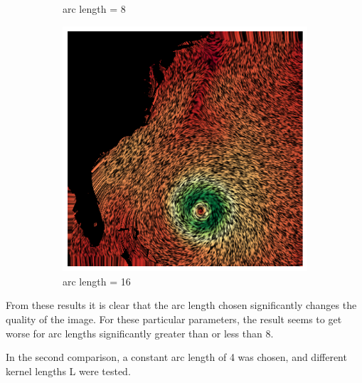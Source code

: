 \documentclass{article}
\begin{document}
\begin{figure}[h!]
\begin{subfigure}{0.32\textwidth}
        \caption{arc length = 8}
    \end{subfigure}
    \hfill
    \begin{subfigure}{0.32\textwidth}
        \centering
        \includegraphics[width=\textwidth]{steps_8000_kernel_length_16.png}
        \caption{arc length = 16}
    \end{subfigure}
    \caption{}
\end{figure}

From these results it is clear that the arc length chosen significantly
changes the quality of the image. For these particular parameters, the result seems to get worse for arc lengths significantly
greater than or less than 8. 

In the second comparison, a constant arc length of 4 was chosen, and different kernel lengths L were tested.
\end{document}
